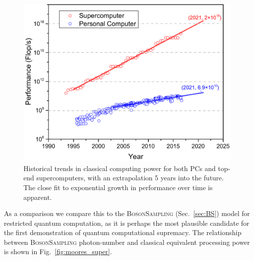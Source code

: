 \documentclass[aps, rmp, twocolumn, amsmath, amssymb, nofootinbib, superscriptaddress, longbibliography, floatfix, table-of-contents, eqsecnum]{revtex4-1}
\begin{document}
\begin{figure}[!htb]
\includegraphics[width=\columnwidth]{moores_law}
\caption{Historical trends in classical computing power for both PCs and top-end supercomputers, with an extrapolation 5 years into the future. The close fit to exponential growth in performance over time is apparent.} \label{fig:moores_law}
\end{figure}

As a comparison we compare this to the \textsc{BosonSampling} (Sec.~\ref{sec:BS}) model for restricted quantum computation, as it is perhaps the most plausible candidate for the first demonstration of quantum computational supremacy. The relationship between \textsc{BosonSampling} photon-number and classical equivalent processing power is shown in Fig.~\ref{fig:moores_super}.
\end{document}
